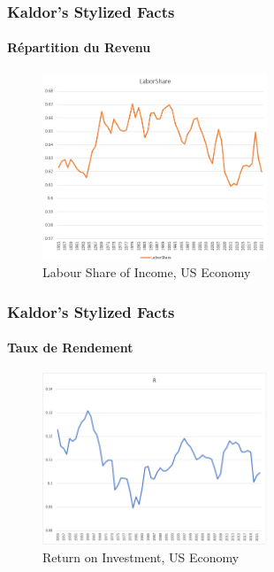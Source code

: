 \documentclass{beamer}
\begin{document}
\begin{frame}
    \frametitle{Kaldor's Stylized Facts}
    \hypertarget{income}{} %
    \framesubtitle{Répartition du Revenu}
        \begin{figure}
            \centering
            \includegraphics[width=0.6\textwidth]{graphs/labor_share.png}
            \caption{Labour Share of Income, US Economy
            \hyperlink{kaldor}{}}
        \end{figure}
\end{frame}

\begin{frame}
    \frametitle{Kaldor's Stylized Facts}
    \hypertarget{return}{} %
    \framesubtitle{Taux de Rendement}
        \begin{figure}
            \centering
            \includegraphics[width=0.6\textwidth]{graphs/r_usa.png}
            \caption{Return on Investment, US Economy
            \hyperlink{kaldor}{}}
        \end{figure}
\end{frame}
\end{document}
